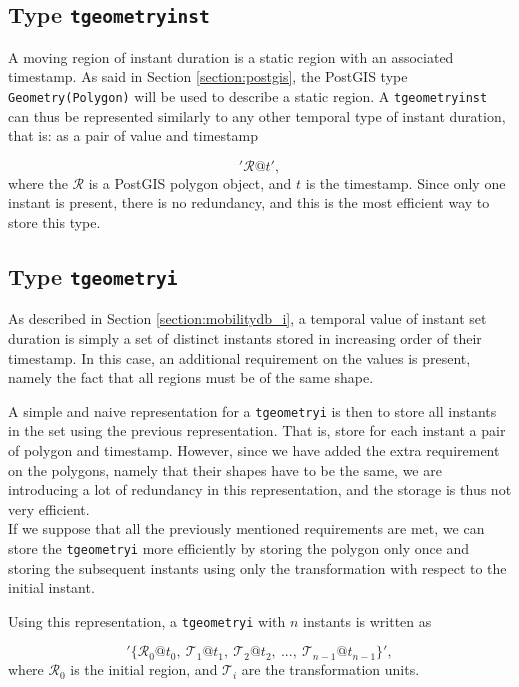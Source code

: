 \subsection{Type \texttt{tgeometryinst}}
\label{section:internal_repr_inst}

A moving region of instant duration is a static region with an associated timestamp. As said in Section \ref{section:postgis}, the PostGIS type \lstinline{Geometry(Polygon)} will be used to describe a static region. A \lstinline{tgeometryinst} can thus be represented similarly to any other temporal type of instant duration, that is: as a pair of value and timestamp

\[
    '\mathcal{R}@t', 
\]
where the \(\mathcal{R}\) is a PostGIS polygon object, and \(t\) is the timestamp. Since only one instant is present, there is no redundancy, and this is the most efficient way to store this type.

\subsection{Type \texttt{tgeometryi}}
\label{section:internal_repr_i}

As described in Section \ref{section:mobilitydb_i}, a temporal value of instant set duration is simply a set of distinct instants stored in increasing order of their timestamp. In this case, an additional requirement on the values is present, namely the fact that all regions must be of the same shape.

A simple and naive representation for a \lstinline{tgeometryi} is then to store all instants in the set using the previous representation. That is, store for each instant a pair of polygon and timestamp. However, since we have added the extra requirement on the polygons, namely that their shapes have to be the same, we are introducing a lot of redundancy in this representation, and the storage is thus not very efficient. \\

If we suppose that all the previously mentioned requirements are met, we can store the \lstinline{tgeometryi}  more efficiently by storing the polygon only once and storing the subsequent instants using only the transformation with respect to the initial instant. 

Using this representation, a \lstinline{tgeometryi} with $n$ instants is written as

\[
    '\{\mathcal{R}_0@t_0,\ \mathcal{T}_1@t_1,\ \mathcal{T}_2@t_2,\ ..., \ \mathcal{T}_{n-1}@t_{n-1}\}', 
\]
where $\mathcal{R}_0$ is the initial region, and $\mathcal{T}_i$ are the transformation units.

